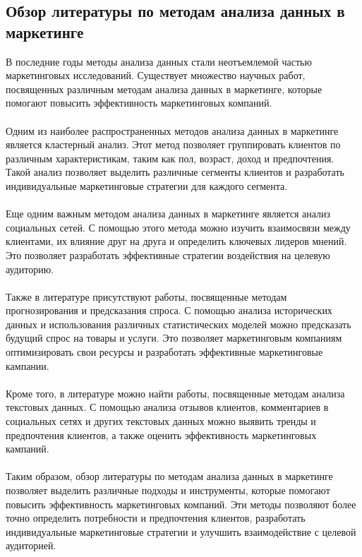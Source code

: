 \documentclass{article}
\begin{document}
\subsection{Обзор литературы по методам анализа данных в маркетинге}
В последние годы методы анализа данных стали неотъемлемой частью маркетинговых исследований. Существует множество научных работ, посвященных различным методам анализа данных в маркетинге, которые помогают повысить эффективность маркетинговых компаний.\\
~\\
Одним из наиболее распространенных методов анализа данных в маркетинге является кластерный анализ. Этот метод позволяет группировать клиентов по различным характеристикам, таким как пол, возраст, доход и предпочтения. Такой анализ позволяет выделить различные сегменты клиентов и разработать индивидуальные маркетинговые стратегии для каждого сегмента.\\
~\\
Еще одним важным методом анализа данных в маркетинге является анализ социальных сетей. С помощью этого метода можно изучить взаимосвязи между клиентами, их влияние друг на друга и определить ключевых лидеров мнений. Это позволяет разработать эффективные стратегии воздействия на целевую аудиторию.\\
~\\
Также в литературе присутствуют работы, посвященные методам прогнозирования и предсказания спроса. С помощью анализа исторических данных и использования различных статистических моделей можно предсказать будущий спрос на товары и услуги. Это позволяет маркетинговым компаниям оптимизировать свои ресурсы и разработать эффективные маркетинговые кампании.\\
~\\
Кроме того, в литературе можно найти работы, посвященные методам анализа текстовых данных. С помощью анализа отзывов клиентов, комментариев в социальных сетях и других текстовых данных можно выявить тренды и предпочтения клиентов, а также оценить эффективность маркетинговых кампаний.\\
~\\
Таким образом, обзор литературы по методам анализа данных в маркетинге позволяет выделить различные подходы и инструменты, которые помогают повысить эффективность маркетинговых компаний. Эти методы позволяют более точно определить потребности и предпочтения клиентов, разработать индивидуальные маркетинговые стратегии и улучшить взаимодействие с целевой аудиторией.
\end{document}
